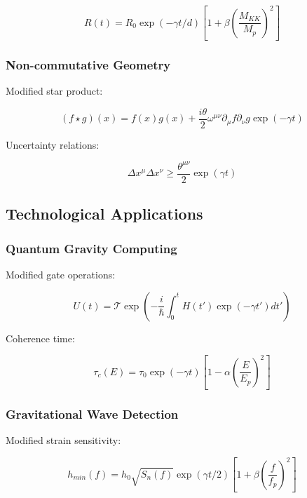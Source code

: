 \documentclass[12pt]{article}
\theoremstyle{plain}
\theoremstyle{definition}
\theoremstyle{remark}
\begin{document}
\begin{equation}
R(t) = R_0\exp(-\gamma t/d)\left[1 + \beta\left(\frac{M_{KK}}{M_p}\right)^2\right]
\end{equation}

\subsubsection{Non-commutative Geometry}

Modified star product:

\begin{equation}
(f \star g)(x) = f(x)g(x) + \frac{i\theta}{2}\omega^{\mu\nu}\partial_\mu f\partial_\nu g\exp(-\gamma t)
\end{equation}

Uncertainty relations:

\begin{equation}
\Delta x^\mu\Delta x^\nu \geq \frac{\theta^{\mu\nu}}{2}\exp(\gamma t)
\end{equation}

\subsection{Technological Applications}

\subsubsection{Quantum Gravity Computing}

Modified gate operations:

\begin{equation}
U(t) = \mathcal{T}\exp\left(-\frac{i}{\hbar}\int_0^t H(t')\exp(-\gamma t')dt'\right)
\end{equation}

Coherence time:

\begin{equation}
\tau_c(E) = \tau_0\exp(-\gamma t)\left[1 - \alpha\left(\frac{E}{E_p}\right)^2\right]
\end{equation}

\subsubsection{Gravitational Wave Detection}

Modified strain sensitivity:

\begin{equation}
h_{min}(f) = h_0\sqrt{S_n(f)}\exp(\gamma t/2)\left[1 + \beta\left(\frac{f}{f_p}\right)^2\right]
\end{equation}
\end{document}
